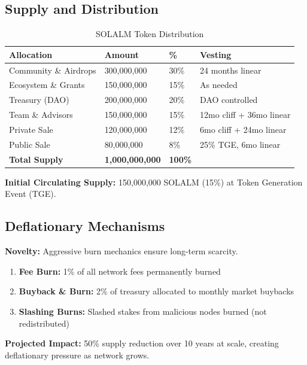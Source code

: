 \documentclass[11pt,a4paper]{article}
\begin{document}
\subsection{Supply and Distribution}

\begin{table}[H]
\centering
\begin{tabular}{@{}llll@{}}
\toprule
\textbf{Allocation} & \textbf{Amount} & \textbf{\%} & \textbf{Vesting} \\
\midrule
Community \& Airdrops & 300,000,000 & 30\% & 24 months linear \\
Ecosystem \& Grants & 150,000,000 & 15\% & As needed \\
Treasury (DAO) & 200,000,000 & 20\% & DAO controlled \\
Team \& Advisors & 150,000,000 & 15\% & 12mo cliff + 36mo linear \\
Private Sale & 120,000,000 & 12\% & 6mo cliff + 24mo linear \\
Public Sale & 80,000,000 & 8\% & 25\% TGE, 6mo linear \\
\midrule
\textbf{Total Supply} & \textbf{1,000,000,000} & \textbf{100\%} & \\
\bottomrule
\end{tabular}
\caption{SOLALM Token Distribution}
\end{table}

\textbf{Initial Circulating Supply:} 150,000,000 SOLALM (15\%) at Token Generation Event (TGE).

\subsection{Deflationary Mechanisms}

\textbf{Novelty:} Aggressive burn mechanics ensure long-term scarcity.

\begin{enumerate}
    \item \textbf{Fee Burn:} 1\% of all network fees permanently burned
    \item \textbf{Buyback \& Burn:} 2\% of treasury allocated to monthly market buybacks
    \item \textbf{Slashing Burns:} Slashed stakes from malicious nodes burned (not redistributed)
\end{enumerate}

\textbf{Projected Impact:} 50\% supply reduction over 10 years at scale, creating deflationary pressure as network grows.
\end{document}
